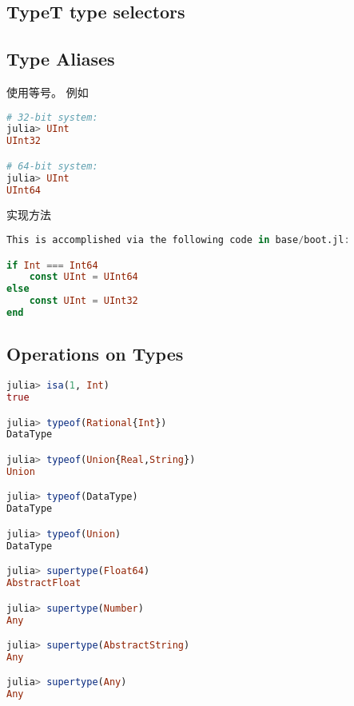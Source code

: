 \subsection{Type{T} type selectors}

\subsection{Type Aliases}
使用等号。 例如
\begin{lstlisting}[language=julia]
# 32-bit system:
julia> UInt
UInt32

# 64-bit system:
julia> UInt
UInt64
\end{lstlisting}
实现方法
\begin{lstlisting}[language=julia]
This is accomplished via the following code in base/boot.jl:

if Int === Int64
    const UInt = UInt64
else
    const UInt = UInt32
end
\end{lstlisting}

\subsection{Operations on Types}
\begin{lstlisting}[language=julia]
julia> isa(1, Int)
true

julia> typeof(Rational{Int})
DataType

julia> typeof(Union{Real,String})
Union

julia> typeof(DataType)
DataType

julia> typeof(Union)
DataType

julia> supertype(Float64)
AbstractFloat

julia> supertype(Number)
Any

julia> supertype(AbstractString)
Any

julia> supertype(Any)
Any
\end{lstlisting}
